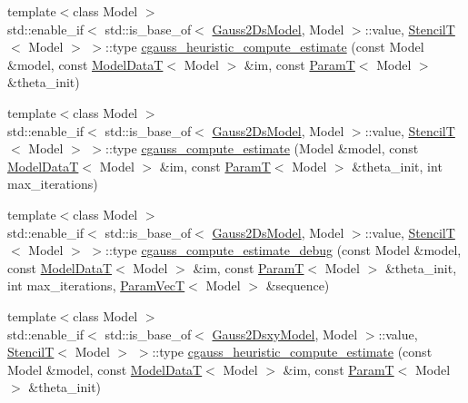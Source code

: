 \begin{DoxyCompactItemize}
\item 
{\footnotesize template$<$class Model $>$ }\\std\+::enable\+\_\+if$<$ std\+::is\+\_\+base\+\_\+of$<$ \hyperlink{classmappel_1_1Gauss2DsModel}{Gauss2\+Ds\+Model}, Model $>$\+::value, \hyperlink{namespacemappel_a3a06598240007876f8c4bf834ad86197}{StencilT}$<$ Model $>$ $>$\+::type \hyperlink{namespacemappel_a22a435e7e9c3da563ae988a31833408b}{cgauss\+\_\+heuristic\+\_\+compute\+\_\+estimate} (const Model \&model, const \hyperlink{namespacemappel_a97f050df953605381ae9c901c3b125f1}{Model\+DataT}$<$ Model $>$ \&im, const \hyperlink{namespacemappel_a667925cb0d6c0e49f2f035cc5a9a6857}{ParamT}$<$ Model $>$ \&theta\+\_\+init)
\item 
{\footnotesize template$<$class Model $>$ }\\std\+::enable\+\_\+if$<$ std\+::is\+\_\+base\+\_\+of$<$ \hyperlink{classmappel_1_1Gauss2DsModel}{Gauss2\+Ds\+Model}, Model $>$\+::value, \hyperlink{namespacemappel_a3a06598240007876f8c4bf834ad86197}{StencilT}$<$ Model $>$ $>$\+::type \hyperlink{namespacemappel_afa049f05f9cb523f415e237dbd704c23}{cgauss\+\_\+compute\+\_\+estimate} (Model \&model, const \hyperlink{namespacemappel_a97f050df953605381ae9c901c3b125f1}{Model\+DataT}$<$ Model $>$ \&im, const \hyperlink{namespacemappel_a667925cb0d6c0e49f2f035cc5a9a6857}{ParamT}$<$ Model $>$ \&theta\+\_\+init, int max\+\_\+iterations)
\item 
{\footnotesize template$<$class Model $>$ }\\std\+::enable\+\_\+if$<$ std\+::is\+\_\+base\+\_\+of$<$ \hyperlink{classmappel_1_1Gauss2DsModel}{Gauss2\+Ds\+Model}, Model $>$\+::value, \hyperlink{namespacemappel_a3a06598240007876f8c4bf834ad86197}{StencilT}$<$ Model $>$ $>$\+::type \hyperlink{namespacemappel_a460a5be5bfa0074503b15ac4c1edb030}{cgauss\+\_\+compute\+\_\+estimate\+\_\+debug} (const Model \&model, const \hyperlink{namespacemappel_a97f050df953605381ae9c901c3b125f1}{Model\+DataT}$<$ Model $>$ \&im, const \hyperlink{namespacemappel_a667925cb0d6c0e49f2f035cc5a9a6857}{ParamT}$<$ Model $>$ \&theta\+\_\+init, int max\+\_\+iterations, \hyperlink{namespacemappel_a0f86d3153e4e27b095012f140eea58de}{Param\+VecT}$<$ Model $>$ \&sequence)
\item 
{\footnotesize template$<$class Model $>$ }\\std\+::enable\+\_\+if$<$ std\+::is\+\_\+base\+\_\+of$<$ \hyperlink{classmappel_1_1Gauss2DsxyModel}{Gauss2\+Dsxy\+Model}, Model $>$\+::value, \hyperlink{namespacemappel_a3a06598240007876f8c4bf834ad86197}{StencilT}$<$ Model $>$ $>$\+::type \hyperlink{namespacemappel_a81262a4320f5a0468ef39f0d8eefbbe4}{cgauss\+\_\+heuristic\+\_\+compute\+\_\+estimate} (const Model \&model, const \hyperlink{namespacemappel_a97f050df953605381ae9c901c3b125f1}{Model\+DataT}$<$ Model $>$ \&im, const \hyperlink{namespacemappel_a667925cb0d6c0e49f2f035cc5a9a6857}{ParamT}$<$ Model $>$ \&theta\+\_\+init)

\end{DoxyCompactItemize}
